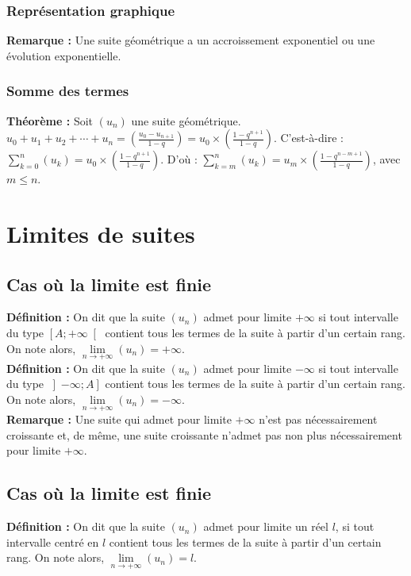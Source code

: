 \documentclass[a4paper,titlepage]{article}
\let\oldsection\section
\renewcommand\section{\clearpage\oldsection}
\begin{document}
        \subsubsection{Représentation graphique}
            \textbf{Remarque :} Une suite géométrique a un accroissement exponentiel ou une évolution exponentielle.
        \subsubsection{Somme des termes}
            \textbf{Théorème :} Soit $\left(u_{n}\right)$ une suite géométrique. $u_{0}+u_{1}+u_{2}+\cdots+u_{n}=\left(\frac{u_{0}-u_{n+1}}{1-q}\right)=u_{0}\times\left(\frac{1-q^{n+1}}{1-q}\right)$. C’est-à-dire : $\sum\limits_{k=0}^{n}\left(u_{k}\right)=u_{0}\times\left(\frac{1-q^{n+1}}{1-q}\right)$. D’où : $\sum\limits_{k=m}^{n}\left(u_{k}\right)=u_{m}\times\left(\frac{1-q^{n-m+1}}{1-q}\right)$, avec $m\leqslant n$.
\section{Limites de suites}
    \subsection{Cas où la limite est finie}
        \textbf{Définition :} On dit que la suite $\left(u_{n}\right)$ admet pour limite $+\infty$ si tout intervalle du type $\left[A;+\infty\right[$ contient tous les termes de la suite à partir d’un certain rang. On note alors, $\lim\limits_{n\to+\infty}\left(u_{n}\right)=+\infty$.
        \\
        \textbf{Définition :} On dit que la suite $\left(u_{n}\right)$ admet pour limite $-\infty$ si tout intervalle du type $\left]-\infty;A\right]$ contient tous les termes de la suite à partir d’un certain rang. On note alors, $\lim\limits_{n\to+\infty}\left(u_{n}\right)=-\infty$.
        \\
        \textbf{Remarque :} Une suite qui admet pour limite $+\infty$ n’est pas nécessairement croissante et, de même, une suite croissante n’admet pas non plus nécessairement pour limite $+\infty$.
    \subsection{Cas où la limite est finie}
        \textbf{Définition :} On dit que la suite $\left(u_{n}\right)$ admet pour limite un réel $l$, si tout intervalle centré en $l$ contient tous les termes de la suite à partir d’un certain rang. On note alors, $\lim\limits_{n\to+\infty}\left(u_{n}\right)=l$.
\end{document}
